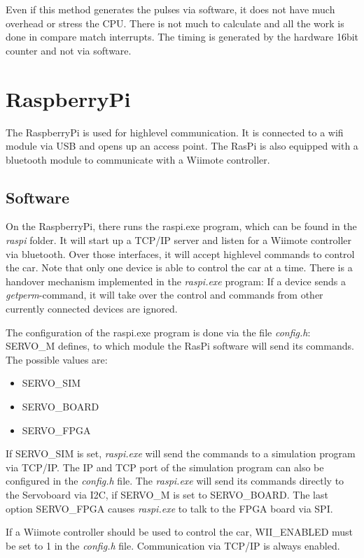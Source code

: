 \documentclass[a4paper
               ,10pt
               ,DIV=10 %
               ,BCOR=0.3cm
               ,pagesize %
               ,headings=small
               ,bibtotoc
               ]
               {scrartcl}
\begin{document}
Even if this method generates the pulses via software, it does not have much overhead or stress the CPU.
There is not much to calculate and all the work is done in compare match interrupts.
The timing is generated by the hardware 16bit counter and not via software.

\section{RaspberryPi}
The RaspberryPi is used for highlevel communication.
It is connected to a wifi module via USB and opens up an access point.
The RasPi is also equipped with a bluetooth module to communicate with a Wiimote controller.

\subsection{Software}
On the RaspberryPi, there runs the raspi.exe program, which can be found in the \textit{raspi} folder.
It will start up a TCP/IP server and listen for a Wiimote controller via bluetooth.
Over those interfaces, it will accept highlevel commands to control the car.
Note that only one device is able to control the car at a time.
There is a handover mechanism implemented in the \textit{raspi.exe} program: If a device sends a \textit{getperm}-command, it will take over the control and commands from other currently connected devices are ignored.


The configuration of the raspi.exe program is done via the file \textit{config.h}:
SERVO\_M defines, to which module the RasPi software will send its commands. The possible values are:
\begin{itemize}
\item{SERVO\_SIM}
\item{SERVO\_BOARD}
\item{SERVO\_FPGA}
\end{itemize}

If SERVO\_SIM is set, \textit{raspi.exe} will send the commands to a simulation program via TCP/IP.
The IP and TCP port of the simulation program can also be configured in the \textit{config.h} file.
The \textit{raspi.exe} will send its commands directly to the Servoboard via I2C, if SERVO\_M is set to SERVO\_BOARD.
The last option SERVO\_FPGA causes \textit{raspi.exe} to talk to the FPGA board via SPI.

If a Wiimote controller should be used to control the car, WII\_ENABLED must be set to 1 in the \textit{config.h} file.
Communication via TCP/IP is always enabled.
\end{document}
